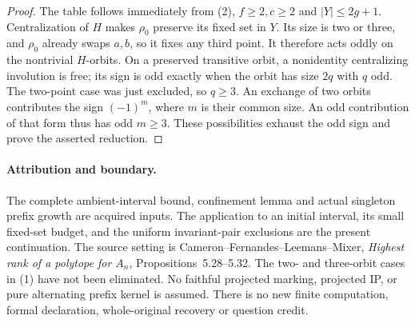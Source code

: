 \documentclass[11pt,a4paper]{article}
\begin{document}
\begin{proof}
The table follows immediately from (2), $f\ge2,c\ge2$
and $|Y|\le2g+1$. Centralization of $H$ makes $\rho_0$
preserve its fixed set in $Y$. Its size is two or three, and
$\rho_0$ already swaps $a,b$, so it fixes any third point.
It therefore acts oddly on the nontrivial $H$-orbits.
On a preserved transitive orbit, a nonidentity centralizing
involution is free; its sign is odd exactly when the orbit has
size $2q$ with $q$ odd. The two-point case was just excluded,
so $q\ge3$. An exchange of two orbits contributes the sign
$(-1)^m$, where $m$ is their common size. An odd contribution
of that form thus has odd $m\ge3$. These possibilities exhaust
the odd sign and prove the asserted reduction.
\end{proof}

\paragraph{Attribution and boundary.}
The complete ambient-interval bound, confinement lemma and actual
singleton prefix growth are acquired inputs. The application to an
initial interval, its small fixed-set budget, and the uniform invariant-pair
exclusions are the present continuation. The source setting is
Cameron--Fernandes--Leemans--Mixer, \emph{Highest rank of a polytope
for $A_n$}, Propositions~5.28--5.32.
The two- and three-orbit cases in (1) have not been eliminated.
No faithful projected marking, projected IP, or pure alternating
prefix kernel is assumed. There is no new finite computation,
formal declaration, whole-original recovery or question credit.
\end{document}
